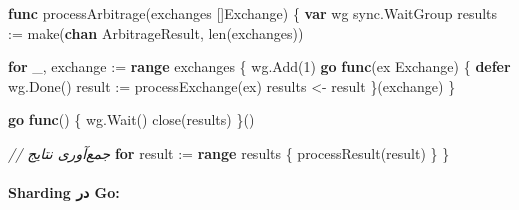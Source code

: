 \documentclass[
]{article}
\newenvironment{Shaded}{}{}
\newcommand{\BuiltInTok}[1]{\textcolor[rgb]{0.00,0.50,0.00}{#1}}
\newcommand{\CommentTok}[1]{\textcolor[rgb]{0.38,0.63,0.69}{\textit{#1}}}
\newcommand{\ControlFlowTok}[1]{\textcolor[rgb]{0.00,0.44,0.13}{\textbf{#1}}}
\newcommand{\DecValTok}[1]{\textcolor[rgb]{0.25,0.63,0.44}{#1}}
\newcommand{\KeywordTok}[1]{\textcolor[rgb]{0.00,0.44,0.13}{\textbf{#1}}}
\newcommand{\NormalTok}[1]{#1}
\newcommand{\OperatorTok}[1]{\textcolor[rgb]{0.40,0.40,0.40}{#1}}
\begin{document}
\begin{Shaded}
\begin{Highlighting}[]
\KeywordTok{func}\NormalTok{ processArbitrage}\OperatorTok{(}\NormalTok{exchanges }\OperatorTok{[]}\NormalTok{Exchange}\OperatorTok{)} \OperatorTok{\{}
    \KeywordTok{var}\NormalTok{ wg sync}\OperatorTok{.}\NormalTok{WaitGroup}
\NormalTok{    results }\OperatorTok{:=} \BuiltInTok{make}\OperatorTok{(}\KeywordTok{chan}\NormalTok{ ArbitrageResult}\OperatorTok{,} \BuiltInTok{len}\OperatorTok{(}\NormalTok{exchanges}\OperatorTok{))}

    \ControlFlowTok{for}\NormalTok{ \_}\OperatorTok{,}\NormalTok{ exchange }\OperatorTok{:=} \KeywordTok{range}\NormalTok{ exchanges }\OperatorTok{\{}
\NormalTok{        wg}\OperatorTok{.}\NormalTok{Add}\OperatorTok{(}\DecValTok{1}\OperatorTok{)}
        \ControlFlowTok{go} \KeywordTok{func}\OperatorTok{(}\NormalTok{ex Exchange}\OperatorTok{)} \OperatorTok{\{}
            \ControlFlowTok{defer}\NormalTok{ wg}\OperatorTok{.}\NormalTok{Done}\OperatorTok{()}
\NormalTok{            result }\OperatorTok{:=}\NormalTok{ processExchange}\OperatorTok{(}\NormalTok{ex}\OperatorTok{)}
\NormalTok{            results }\OperatorTok{\textless{}{-}}\NormalTok{ result}
        \OperatorTok{\}(}\NormalTok{exchange}\OperatorTok{)}
    \OperatorTok{\}}

    \ControlFlowTok{go} \KeywordTok{func}\OperatorTok{()} \OperatorTok{\{}
\NormalTok{        wg}\OperatorTok{.}\NormalTok{Wait}\OperatorTok{()}
        \BuiltInTok{close}\OperatorTok{(}\NormalTok{results}\OperatorTok{)}
    \OperatorTok{\}()}

    \CommentTok{// جمع‌آوری نتایج}
    \ControlFlowTok{for}\NormalTok{ result }\OperatorTok{:=} \KeywordTok{range}\NormalTok{ results }\OperatorTok{\{}
\NormalTok{        processResult}\OperatorTok{(}\NormalTok{result}\OperatorTok{)}
    \OperatorTok{\}}
\OperatorTok{\}}
\end{Highlighting}
\end{Shaded}

\paragraph{Sharding در Go:}\label{sharding-ux62fux631-go}
\end{document}
